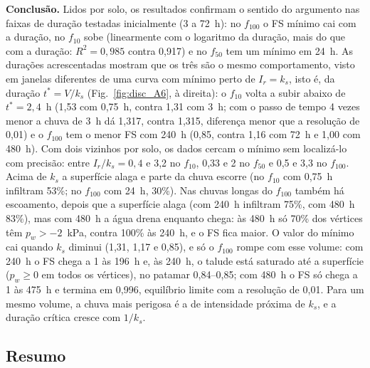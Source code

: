 \textbf{Conclus\~ao.} Lidos por solo, os resultados confirmam o sentido do argumento nas faixas de dura\c{c}\~ao
testadas inicialmente (3 a 72~h): no $f_{100}$ o FS m\'inimo cai com a dura\c{c}\~ao, no $f_{10}$ sobe (linearmente com o
logaritmo da dura\c{c}\~ao, mais do que com a dura\c{c}\~ao: $R^2=0{,}985$ contra 0,917) e no $f_{50}$ tem um m\'inimo em
24~h. As dura\c{c}\~oes acrescentadas mostram que os tr\^es s\~ao o mesmo comportamento, visto em janelas diferentes de
uma curva com m\'inimo perto de $I_r=k_s$, isto \'e, da dura\c{c}\~ao $t^*=V/k_s$ (Fig.~\ref{fig:disc_A6}, \`a direita):
o $f_{10}$ volta a subir abaixo de $t^*=2{,}4$~h (1,53 com 0,75~h, contra 1,31 com 3~h; com o passo de tempo 4 vezes
menor a chuva de 3~h d\'a 1,317, contra 1,315, diferen\c{c}a menor que a resolu\c{c}\~ao de 0,01) e o $f_{100}$ tem o
menor FS com 240~h (0,85, contra 1,16 com 72~h e 1,00 com 480~h). Com dois vizinhos por solo, os dados cercam o
m\'inimo sem localiz\'a-lo com precis\~ao: entre $I_r/k_s=0{,}4$ e 3,2 no $f_{10}$, 0,33 e 2 no $f_{50}$ e 0,5 e 3,3 no
$f_{100}$. Acima de $k_s$ a superf\'icie alaga e parte da chuva escorre (no $f_{10}$ com 0,75~h infiltram 53\%; no
$f_{100}$ com 24~h, 30\%). Nas chuvas longas do $f_{100}$ tamb\'em h\'a escoamento, depois que a superf\'icie alaga (com
240~h infiltram 75\%, com 480~h 83\%), mas com 480~h a \'agua drena enquanto chega: \`as 480~h s\'o 70\% dos v\'ertices
t\^em $p_w>-2$~kPa, contra 100\% \`as 240~h, e o FS fica maior. O valor do m\'inimo cai quando $k_s$ diminui (1,31,
1,17 e 0,85), e s\'o o $f_{100}$ rompe com esse volume: com 240~h o FS chega a 1 \`as 196~h e, \`as 240~h, o talude est\'a
saturado at\'e a superf\'icie ($p_w\ge0$ em todos os v\'ertices), no patamar 0,84--0,85; com 480~h o FS s\'o chega a 1
\`as 475~h e termina em 0,996, equil\'ibrio limite com a resolu\c{c}\~ao de 0,01. Para um mesmo volume, a chuva mais
perigosa \'e a de intensidade pr\'oxima de $k_s$, e a dura\c{c}\~ao cr\'itica cresce com $1/k_s$.

\subsection{Resumo}

